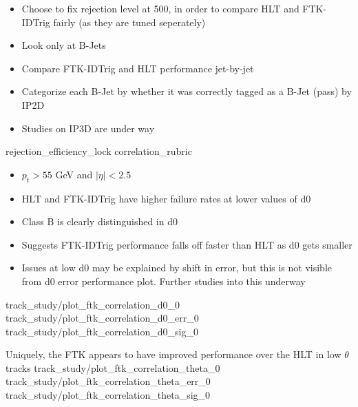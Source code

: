     { \begin{itemize}
        \item Choose to fix rejection level at 500,
            in order to compare HLT and FTK-IDTrig fairly (as they are tuned seperately)
        \item Look only at B-Jets
        \item Compare FTK-IDTrig and HLT performance jet-by-jet
        \item Categorize each B-Jet by whether it was correctly tagged as a B-Jet (pass) by IP2D
        \item Studies on IP3D are under way
    \end{itemize} }
    {rejection_efficiency_lock}
    {correlation_rubric}

    { \begin{itemize}
        \item $p_t > 55$ GeV and $|\eta| < 2.5$
        \item HLT and FTK-IDTrig have higher failure rates at lower values of d0
        \item Class B is clearly distinguished in d0
        \item Suggests FTK-IDTrig performance falls off faster than HLT as d0 gets smaller
        \item Issues at low d0 may be explained by shift in error,
            but this is not visible from d0 error performance plot.
            Further studies into this underway
    \end{itemize} }
    {track_study/plot_ftk_correlation_d0_0}
    {track_study/plot_ftk_correlation_d0_err_0}
    {track_study/plot_ftk_correlation_d0_sig_0}

    {\small \vspace{30pt} Uniquely, the FTK appears to have improved performance over the HLT
        in low $\theta$ tracks}
    {track_study/plot_ftk_correlation_theta_0}
    {track_study/plot_ftk_correlation_theta_err_0}
    {track_study/plot_ftk_correlation_theta_sig_0}
